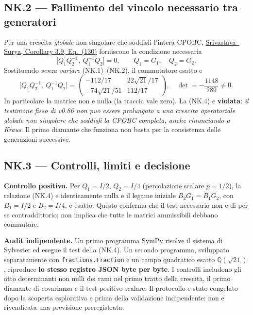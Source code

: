 \documentclass[11pt,a4paper]{article}
\begin{document}
\clearpage
\subsection*{NK.2 --- Fallimento del vincolo necessario tra generatori}
Per una crescita \emph{globale} non singolare che soddisfi l'intera CPOBC, \href{https://arxiv.org/html/2603.25503}{Srivastava--Surya, Corollary 3.9, Eq.~(130)} forniscono la condizione necessaria
\begin{equation}
\boxed{\bigl[Q_1Q_2^{-1},\ Q_1^{-1}Q_2\bigr]=0},\qquad Q_1=G_1,\quad Q_2=G_2.\tag{NK.4}
\end{equation}
Sostituendo \emph{senza variare} (NK.1)--(NK.2), il commutatore esatto e
\begin{equation}
\boxed{
\bigl[Q_1Q_2^{-1},\ Q_1^{-1}Q_2\bigr]
=\begin{pmatrix}
-112/17&22\sqrt{21}/17\\
-74\sqrt{21}/51&112/17
\end{pmatrix}},\quad
\boxed{\det=-\frac{1148}{289}\ne0}.\tag{NK.5}
\end{equation}
In particolare la matrice non e nulla (la traccia vale zero). La (NK.4) e \textbf{violata}: \emph{il testimone fisso di v0.86 non puo essere prolungato a una crescita operatoriale globale non singolare che soddisfi la CPOBC completa, anche rinunciando a Kraus}. Il primo diamante che funziona non basta per la consistenza delle generazioni successive.

\subsection*{NK.3 --- Controlli, limiti e decisione}
\textbf{Controllo positivo.} Per $Q_1=I/2$, $Q_2=I/4$ (percolazione scalare $p=1/2$), la relazione (NK.4) e identicamente nulla e il legame iniziale $B_2G_1=B_1G_2$, con $B_1=I/2$ e $B_2=I/4$, e esatto. Questo conferma che il test necessario non e di per se contraddittorio; non implica che tutte le matrici ammissibili debbano commutare.

\textbf{Audit indipendente.} Un primo programma SymPy risolve il sistema di Sylvester ed esegue il test della (NK.4). Un secondo programma, sviluppato separatamente con \texttt{fractions.Fraction} e un campo quadratico esatto $\mathbb Q(\sqrt{21})$, riproduce \textbf{lo stesso registro JSON byte per byte}. I controlli includono gli otto determinanti non nulli dei rami nel primo tratto della crescita, il primo diamante di covarianza e il test positivo scalare. Il protocollo e stato congelato dopo la scoperta esplorativa e prima della validazione indipendente: non e rivendicata una previsione preregistrata.
\end{document}
